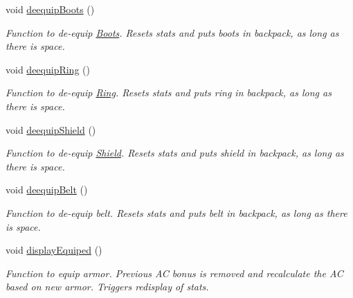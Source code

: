 \begin{DoxyCompactItemize}
void \hyperlink{class_fighter_add80df04f0659d37c0e30e91314e3d5e}{deequip\+Boots} ()
\begin{DoxyCompactList}\small\item\em Function to de-\/equip \hyperlink{class_boots}{Boots}. Resets stats and puts boots in backpack, as long as there is space. \end{DoxyCompactList}\item 
\hypertarget{class_fighter_a1b64aab99d09a1d9a31b8674b4d0176c}{}\label{class_fighter_a1b64aab99d09a1d9a31b8674b4d0176c} 
void \hyperlink{class_fighter_a1b64aab99d09a1d9a31b8674b4d0176c}{deequip\+Ring} ()
\begin{DoxyCompactList}\small\item\em Function to de-\/equip \hyperlink{class_ring}{Ring}. Resets stats and puts ring in backpack, as long as there is space. \end{DoxyCompactList}\item 
\hypertarget{class_fighter_a313e661908412be41e7f3f67c3c050f4}{}\label{class_fighter_a313e661908412be41e7f3f67c3c050f4} 
void \hyperlink{class_fighter_a313e661908412be41e7f3f67c3c050f4}{deequip\+Shield} ()
\begin{DoxyCompactList}\small\item\em Function to de-\/equip \hyperlink{class_shield}{Shield}. Resets stats and puts shield in backpack, as long as there is space. \end{DoxyCompactList}\item 
\hypertarget{class_fighter_a529fdd57ee79c761a7601356f861d7fb}{}\label{class_fighter_a529fdd57ee79c761a7601356f861d7fb} 
void \hyperlink{class_fighter_a529fdd57ee79c761a7601356f861d7fb}{deequip\+Belt} ()
\begin{DoxyCompactList}\small\item\em Function to de-\/equip belt. Resets stats and puts belt in backpack, as long as there is space. \end{DoxyCompactList}\item 
\hypertarget{class_fighter_a30734efb2140029276fd7528d28685fc}{}\label{class_fighter_a30734efb2140029276fd7528d28685fc} 
void \hyperlink{class_fighter_a30734efb2140029276fd7528d28685fc}{display\+Equiped} ()
\begin{DoxyCompactList}\small\item\em Function to equip armor. Previous AC bonus is removed and recalculate the AC based on new armor. Triggers redisplay of stats. \end{DoxyCompactList}\item 

\end{DoxyCompactItemize}
